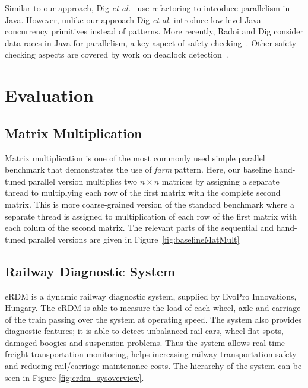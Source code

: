 Similar to our approach, Dig \textit{et al.}~\cite{dig} use refactoring to introduce parallelism in Java. However, unlike our approach Dig \textit{et al.} introduce low-level Java concurrency primitives instead of patterns. More recently,  Radoi and Dig consider data races in Java for parallelism, a key aspect of safety checking~\cite{DBLP:journals/tosem/RadoiD15}. Other safety checking aspects are covered by work on deadlock detection~\cite{DBLP:journals/tse/Corbett96}.


\section{Evaluation}

\subsection{Matrix Multiplication}
\noindent Matrix multiplication is one of the most commonly used simple parallel benchmark that demonstrates the use of \emph{farm} pattern. Here, our baseline hand-tuned parallel version multiplies two $n \times n$ matrices by assigning a separate thread to multiplying each row of the first matrix with the complete second matrix. This is more coarse-grained version of the standard benchmark where a separate thread is assigned to multiplication of each row of the first matrix with each colum of the second matrix. The relevant parts of the sequential and hand-tuned parallel versions are given in Figure~\ref{fig:baselineMatMult}




\subsection{Railway Diagnostic System}

eRDM is a dynamic railway diagnostic system, supplied by EvoPro Innovations, Hungary. The eRDM is able to measure the load of each wheel, axle and carriage of the train passing over the system at operating speed. The system also provides diagnostic features; it is able to detect unbalanced rail-cars, wheel flat spots, damaged boogies and suspension problems. Thus the system allows real-time freight transportation monitoring, helps increasing railway transportation safety and reducing rail/carriage maintenance costs. The hierarchy of the system can be seen in Figure \ref{fig:erdm_sysoverview}.

